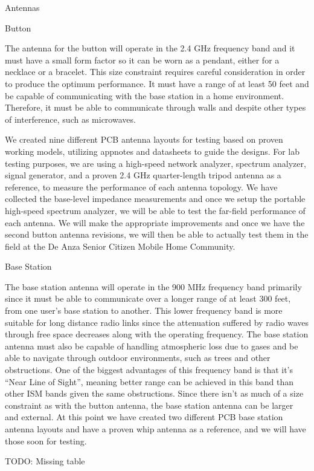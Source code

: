 \documentclass[journal]{IEEEtran}
\begin{document}
Antennas

Button

The antenna for the button will operate in the 2.4 GHz frequency band and it must have a small form factor so it can be worn as a pendant, either for a necklace or a bracelet.  This size constraint requires careful consideration in order to produce the optimum performance.  It must have a range of at least 50 feet and be capable of communicating with the base station in a home environment.  Therefore, it must be able to communicate through walls and despite other types of interference, such as microwaves.

We created nine different PCB antenna layouts for testing based on proven working models, utilizing appnotes and datasheets to guide the designs.  For lab testing purposes, we are using a high-speed network analyzer, spectrum analyzer, signal generator, and a proven 2.4 GHz quarter-length tripod antenna as a reference, to measure the performance of each antenna topology.  We have collected the base-level impedance measurements and once we setup the portable high-speed spectrum analyzer, we will be able to test the far-field performance of each antenna.  We will make the appropriate improvements and once we have the second button antenna revisions, we will then be able to actually test them in the field at the De Anza Senior Citizen Mobile Home Community.

Base Station

The base station antenna will operate in the 900 MHz frequency band primarily since it must be able to communicate over a longer range of at least 300 feet, from one user’s base station to another.  This lower frequency band is more suitable for long distance radio links since the attenuation suffered by radio waves through free space decreases along with the operating frequency.  The base station antenna must also be capable of handling atmospheric loss due to gases and be able to navigate through outdoor environments, such as trees and other obstructions.  One of the biggest advantages of this frequency band is that it’s “Near Line of Sight”, meaning better range can be achieved in this band than other ISM bands given the same obstructions.  Since there isn’t as much of a size constraint as with the button antenna, the base station antenna can be larger and external.  At this point we have created two different PCB base station antenna layouts and have a proven whip antenna as a reference, and we will have those soon for testing.

TODO: Missing table
\end{document}
